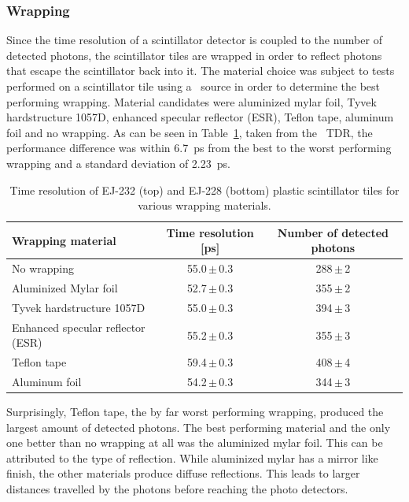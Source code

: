 \documentclass[../BTOF_summary.tex]{subfiles}
\begin{document}
\subsubsection*{Wrapping}
Since the time resolution of a scintillator detector is coupled to the number of detected photons, the scintillator tiles are wrapped in order to reflect photons that escape the scintillator back into it.
The material choice was subject to tests performed on a scintillator tile using a \sr\ source in order to determine the best performing wrapping.
Material candidates were aluminized mylar foil, Tyvek hardstructure 1057D, enhanced specular reflector (ESR), Teflon tape, aluminum foil and no wrapping.
As can be seen in Table~\ref{tab:WrappingTest}, taken from the \btof\ TDR, the performance difference was within \SI{6.7}{ps} from the best to the worst performing wrapping and a standard deviation of \SI{2.23}{ps}.

\begin{table}[htbp]
	\caption[Time resolution for different wrapping materials]{Time resolution of EJ-232 (top) and EJ-228 (bottom) plastic scintillator tiles for various wrapping materials.
		\label{tab:WrappingTest}}
	\centering
	{
		\begin{tabular}{ l  c  c }
			\toprule
			Wrapping material                 & Time resolution [ps] & Number of detected photons \\
			\midrule
			No wrapping                       & 55.0\,$\pm$\,0.3     & 288\,$\pm$\,2\\
			Aluminized Mylar foil             & 52.7\,$\pm$\,0.3     & 355\,$\pm$\,2\\
			Tyvek hardstructure 1057D         & 55.0\,$\pm$\,0.3     & 394\,$\pm$\,3\\
			Enhanced specular reflector (ESR) & 55.2\,$\pm$\,0.3     & 355\,$\pm$\,3\\
			Teflon tape                       & 59.4\,$\pm$\,0.3     & 408\,$\pm$\,4\\
			Aluminum foil                     & 54.2\,$\pm$\,0.3     & 344\,$\pm$\,3\\
			\midrule
		\end{tabular}
	}
\end{table}

Surprisingly, Teflon tape, the by far worst performing wrapping, produced the largest amount of detected photons.
The best performing material and the only one better than no wrapping at all was the aluminized mylar foil.
This can be attributed to the type of reflection.
While aluminized mylar has a mirror like finish, the other materials produce diffuse reflections.
This leads to larger distances travelled by the photons before reaching the photo detectors.
\end{document}
